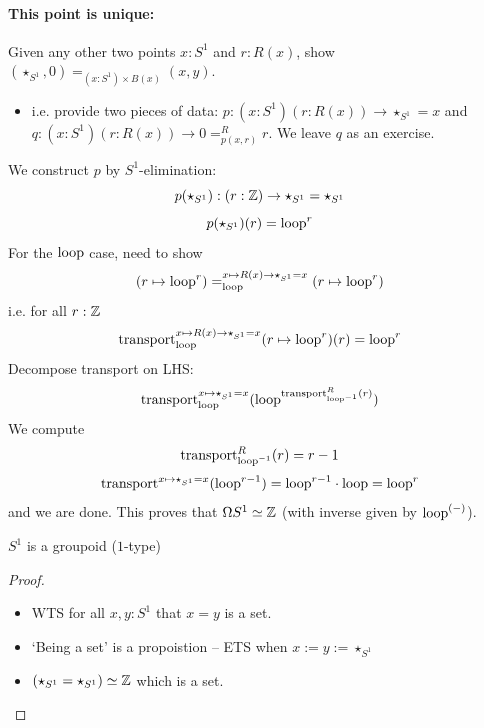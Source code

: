 \documentclass[10pt,oneside,leqno,openright]{memoir}
\begin{document}
\paragraph{This point is unique:} Given any other two points $x : S^1$ and $r : R(x)$, show $(\star_{S^1},0) =_{(x:S^1) \times B(x)} (x,y)$.
\begin{itemize}
\item i.e. provide two pieces of data: $p : (x : S^1) (r : R(x)) \to \star_{S^1} = x$ and $q : (x : S^1) (r : R(x)) \to 0 =^{R}_{p(x,r)} r$. We leave $q$ as an exercise.
\end{itemize}
We construct $p$ by $S^1$-elimination:
\[p(\star_{S^1}) : (r : \mathbb{Z}) \to \star_{S^1} = \star_{S^1} \]
\[p(\star_{S^1})(r) = \mathrm{loop}^r \]
For the $\mathrm{loop}$ case, need to show
\begin{align*}
  (r \mapsto \mathrm{loop}^r) =^{x \mapsto R(x) \to \star_{S^1} = x}_{\mathrm{loop}} (r \mapsto \mathrm{loop}^r)
\end{align*}
i.e. for all $r: \mathbb{Z}$
\begin{align*}
  \operatorname{transport}^{x \mapsto R(x) \to \star_{S^1} = x}_{\mathrm{loop}}(r \mapsto \mathrm{loop}^r)(r) = \mathrm{loop}^r
\end{align*}
 Decompose transport on LHS:
\begin{align*}
  \operatorname{transport}^{x \mapsto \star_{S^1} = x}_{\mathrm{loop}}(\mathrm{loop}^{\operatorname{transport}^{R}_{\mathrm{loop}^{-1}}(r)})
\end{align*}
We compute
\[
{\operatorname{transport}^{R}_{\mathrm{loop}^{-1}}(r)} = r-1
\]
\[ \operatorname{transport}^{x \mapsto \star_{S^1} = x}(\mathrm{loop}^{r-1}) = \mathrm{loop}^{r-1} \cdot \mathrm{loop} = \mathrm{loop}^r \]
and we are done. This proves that $\Omega S^1 \simeq \mathbb{Z}$ (with inverse given by $\mathrm{loop}^{(-)}$).

\begin{corollary}
  $S^1$ is a groupoid ($1$-type)
\end{corollary}
\begin{proof}
  \begin{itemize}
  \item WTS for all $x,y : S^1$ that $x = y$ is a set.
  \item `Being a set' is a propoistion -- ETS when $x := y := \star_{S^1}$
  \item $(\star_{S^1} = \star_{S^1}) \simeq \mathbb{Z}$ which is a set. \qedhere
  \end{itemize}
\end{proof}
\end{document}
